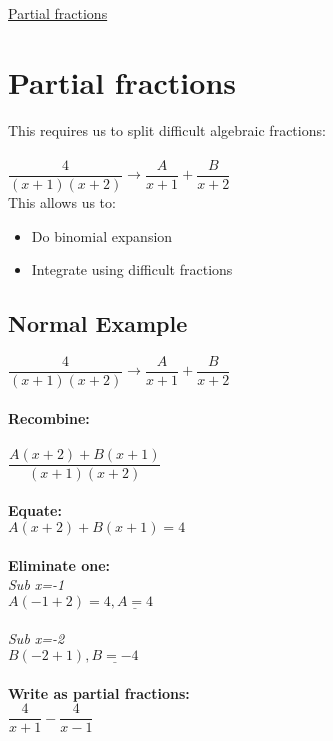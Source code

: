 \documentclass{article}[18pt]
\begin{document}
\begin{center}
\underline{\huge Partial fractions}
\end{center}
\section{Partial fractions}
This requires us to split difficult algebraic fractions:\\
\\
$\dfrac{4}{(x+1)(x+2)}\rightarrow\dfrac{A}{x+1}+\dfrac{B}{x+2}$\\
This allows us to:
\begin{itemize}
\item Do binomial expansion
\item Integrate using difficult fractions
\end{itemize}
\subsection{Normal Example}

$\dfrac{4}{(x+1)(x+2)}\rightarrow\dfrac{A}{x+1}+\dfrac{B}{x+2}$\\
\\
\textbf{Recombine:}\\
\\
$\dfrac{A(x+2)+B(x+1)}{(x+1)(x+2)}$\\
\\
\textbf{Equate:}\\
$A(x+2)+B(x+1)=4$\\
\\
\textbf{Eliminate one:}\\
\textit{Sub x=-1}\\
$A(-1+2)=4, \underline{A=4}$\\
\\
\textit{Sub x=-2}\\
$B(-2+1), \underline{B=-4}$\\
\\
\textbf{Write as partial fractions:}\\
$\dfrac{4}{x+1}-\dfrac{4}{x-1}$
\end{document}
